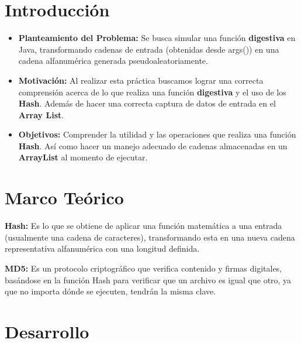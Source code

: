 \documentclass[letterpaper,12pt]{article}
\begin{document}
\tableofcontents
\clearpage

\section{Introducción}

\begin{itemize}
\item \textbf{Planteamiento del Problema:} Se busca simular una función \textbf{digestiva} en Java, transformando cadenas de entrada (obtenidas desde args()) en una cadena alfanumérica generada pseudoaleatoriamente. 

\item \textbf{Motivación:} Al realizar esta práctica buscamos lograr una correcta comprensión acerca de lo que realiza una función \textbf{digestiva} y el uso de los \textbf{Hash}. Además de hacer una correcta captura de datos de entrada en el \textbf{Array List}.

\item \textbf{Objetivos:} Comprender la utilidad y las operaciones que realiza una función \textbf{Hash}. Así como hacer un manejo adecuado de cadenas almacenadas en un \textbf{ArrayList} al momento de ejecutar.

\end{itemize}
\section{Marco Teórico}
\textbf{Hash:} Es lo que se obtiene de aplicar una función matemática a una entrada (usualmente una cadena de caracteres), transformando esta en una nueva cadena representativa alfanumérica con una longitud definida.~\cite{hash}

\textbf{MD5:} Es un protocolo criptográfico que verifica contenido y firmas digitales, basándose en la función Hash para verificar que un archivo es igual que otro, ya que no importa dónde se ejecuten, tendrán la misma clave.~\cite{MD5}


\section{Desarrollo}
\end{document}
